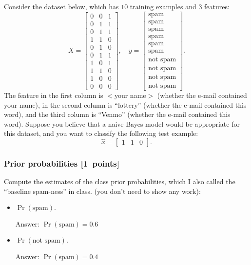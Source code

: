 \documentclass{article}
\newcommand{\blu}[1]{{\textcolor{blu}{#1}}}
\newcommand{\gre}[1]{\textcolor{gre}{#1}}
\newcommand\ans[1]{\par\gre{Answer: #1}}
\let\ask\blu
\newcommand\pts[1]{\textcolor{pointscolour}{[#1~points]}}
\begin{document}
    Consider the dataset below, which has $10$ training examples and $3$ features:
    \[
    X = \begin{bmatrix}
        0 & 0 & 1\\
        0 & 1 & 1\\
        0 & 1 & 1\\
        1 & 1 & 0\\
        0 & 1 & 0\\
        0 & 1 & 1\\
        1 & 0 & 1\\
        1 & 1 & 0\\
        1 & 0 & 0\\
        0 & 0 & 0
    \end{bmatrix},
    \quad y = \begin{bmatrix}
        \text{spam}\\
        \text{spam}\\
        \text{spam}\\
        \text{spam}\\
        \text{spam}\\
        \text{spam}\\
        \text{not spam}\\
        \text{not spam}\\
        \text{not spam}\\
        \text{not spam}
    \end{bmatrix}.
    \]
    The feature in the first column is $<$your name$>$ (whether the e-mail contained your name), in the second column is ``lottery'' (whether the e-mail contained this word), and the third column is ``Venmo'' (whether the e-mail contained this word).
    Suppose you believe that a naive Bayes model would be appropriate for this dataset, and you want to classify the following test example:
    \[
    \hat{x} = \begin{bmatrix}1 & 1 & 0\end{bmatrix}.
    \]

    \subsubsection{Prior probabilities \pts{1}}
    \ask{Compute the estimates of the class prior probabilities, which I also called the ``baseline spam-ness'' in class.} (you don't need to show any work):
    \begin{itemize}
        \item $\Pr(\text{spam})$.
        \ans{$\Pr(\text{spam}) = 0.6$}
        \item $\Pr(\text{not spam})$.
        \ans{$\Pr(\text{spam}) = 0.4$}
    \end{itemize}
    \newpage
\end{document}
